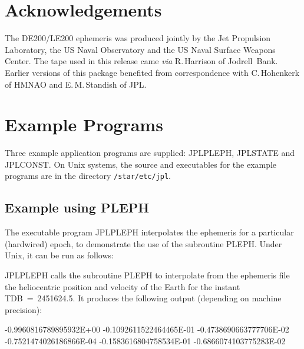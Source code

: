 \documentclass[twoside,11pt,nolof]{starlink}
\begin{document}
\section{Acknowledgements}
\label{acknowledgements}

The DE200/LE200 ephemeris was produced jointly by the Jet Propulsion
Laboratory, the US Naval Observatory and the US Naval Surface Weapons
Center.  The tape used in this release came \textit{via}\/ R.\,Harrison
of Jodrell~Bank.  Earlier versions of this package benefited from
correspondence with C.\,Hohenkerk of HMNAO and E.\,M.\,Standish of JPL.

\newpage
\appendix

\section{Example Programs}
\label{example_programs}

Three example application programs are supplied: JPLPLEPH, JPLSTATE and
JPLCONST.  On Unix systems, the source and executables for the example
programs are in the directory \texttt{/star/etc/jpl}.

\subsection{Example using PLEPH}
\label{example_using_pleph}

The executable program JPLPLEPH interpolates the ephemeris for a
particular (hardwired) epoch, to demonstrate the use of the subroutine
PLEPH. Under Unix, it can be run as follows:

\begin{terminalv}
\end{terminalv}

JPLPLEPH calls the subroutine PLEPH to interpolate from the ephemeris
file the heliocentric position and velocity of the Earth for the instant
TDB~=~2451624.5.  It produces the following output (depending on machine
precision):

\begin{small}
\begin{terminalv}
-0.9960816789895932E+00
-0.1092611522464465E-01
-0.4738690663777706E-02
-0.7521474026186866E-04
-0.1583616804758534E-01
-0.6866074103775283E-02
\end{terminalv}
\end{small}
\end{document}
